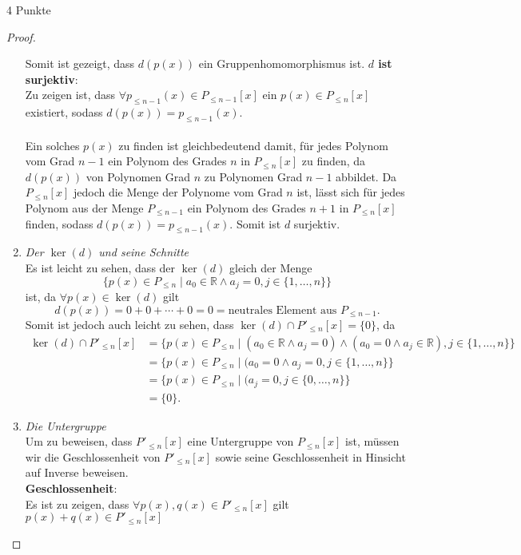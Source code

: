 \documentclass{problemset}
\begin{document}
\begin{problem}{4 Punkte}
\begin{proof}
\begin{enumerate}
              Somit ist gezeigt, dass $d(p(x))$ ein Gruppenhomomorphismus ist. \checkmark
              \textbf{$d$ ist surjektiv}: \\ Zu zeigen ist, dass $\forall p_{\le n-1}(x) \in
                  P_{\le n-1}[x]$ ein $p(x) \in P_{\le n}[x]$ existiert, sodass $d(p(x)) = p_{\le
                          n-1}(x)$. \\\\ Ein solches $p(x)$ zu finden ist gleichbedeutend damit, für
              jedes Polynom vom Grad $n-1$ ein Polynom des Grades $n$ in $P_{\le n}[x]$ zu
              finden, da $d(p(x))$ von Polynomen Grad $n$ zu Polynomen Grad $n-1$ abbildet.
              Da $P_{\le n}[x]$ jedoch die Menge der Polynome vom Grad $n$ ist, lässt sich
              für jedes Polynom aus der Menge $P_{\le n - 1}$ ein Polynom des Grades $n+1$ in
              $P_{\le n}[x]$ finden, sodass $d(p(x)) = p_{\le n -1}(x)$. Somit ist $d$
              surjektiv. \checkmark
        \item \textit{Der $\ker(d)$ und seine Schnitte} \\
              Es ist leicht zu sehen, dass der $\ker(d)$ gleich der Menge
              \[
                  \{p(x) \in P_{\le n} \mid a_0 \in \mathbb{R} \land a_j = 0, j \in \{1, \ldots, n\}\}
              \]
              ist, da $\forall p(x) \in \ker(d)$ gilt
              \[
                  d(p(x)) = 0 + 0 + \cdots + 0 = 0 = \text{neutrales Element aus } P_{\le n-1}.
              \]
              Somit ist jedoch auch leicht zu sehen, dass $\ker(d) \cap P'_{\le n}[x] =
                  \{0\}$, da
              \begin{align}
                  \ker(d) \cap P'_{\le n}[x] & = \{p(x) \in P_{\le n} \mid (a_0 \in \mathbb{R} \land a_j = 0) \land (a_0 = 0 \land a_j \in \mathbb{R}), j \in \{1, \ldots, n\}\} \\
                                             & = \{p(x) \in P_{\le n} \mid (a_0 = 0 \land a_j = 0, j \in \{1, \ldots, n\}\}                                                      \\
                                             & = \{p(x) \in P_{\le n} \mid (a_j = 0, j \in \{0, \ldots, n\}\}                                                                    \\
                                             & = \{0\}.
              \end{align}
              \checkmark
        \item \textit{Die Untergruppe} \\
              Um zu beweisen, dass $P'_{\le n}[x]$ eine Untergruppe von $P_{\le n}[x]$ ist,
              müssen wir die Geschlossenheit von $P'_{\le n}[x]$ sowie seine Geschlossenheit
              in Hinsicht auf Inverse beweisen. \\ \textbf{Geschlossenheit}: \\ Es ist zu
              zeigen, dass $\forall p(x),q(x) \in P'_{\le n}[x]$ gilt $p(x) + q(x) \in
                  P'_{\le n}[x]$


\end{enumerate}
\end{proof}
\end{problem}
\end{document}
